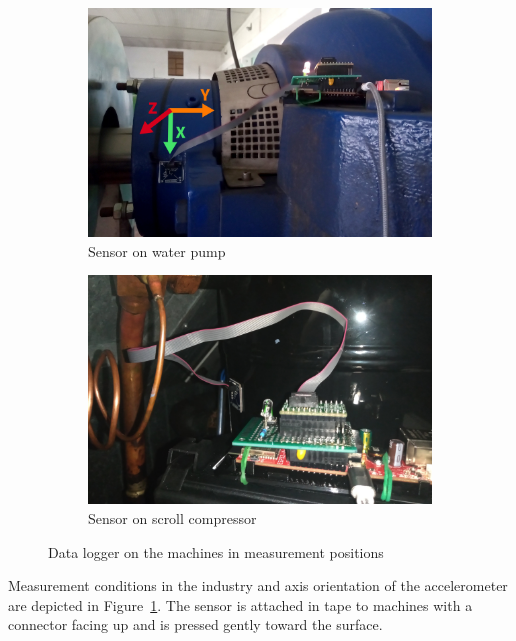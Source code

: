\begin{figure}[h]
    \centering
    \begin{subfigure}[b]{0.49\textwidth}
        \includegraphics[width=\textwidth]{assets/design/sensor/sensor.jpg}
        \caption{Sensor on water pump}
    \end{subfigure}
    \hfill
    \begin{subfigure}[b]{0.49\textwidth}
        \includegraphics[width=\textwidth]{assets/design/sensor/sensor-compressor.jpg}
        \caption{Sensor on scroll compressor}
    \end{subfigure}
    \caption{Data logger on the machines in measurement positions}
    \label{fig:implementation:sensor-on-machine}
\end{figure}

Measurement conditions in the industry and axis orientation of the accelerometer are depicted in Figure~\ref{fig:implementation:sensor-on-machine}. The sensor is attached in tape to machines with a connector facing up and is pressed gently toward the surface.